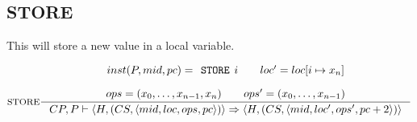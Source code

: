 \subsection{STORE}
This will store a new value in a local variable.

$$\inference[STORE]{
inst(P,mid, pc) = \texttt{STORE }i \semsp
loc' = loc[i \mapsto x_n]\semnl\\
ops = (x_0, \ldots, x_{n-1}, x_n) \semsp 
ops' = (x_0, \ldots, x_{n-1})
}
{CP, P \vdash \langle H, (CS, \langle mid, loc, ops, pc \rangle )\rangle \Rightarrow \langle H, (CS, \langle mid, loc', ops', pc + 2 \rangle )\rangle}$$
